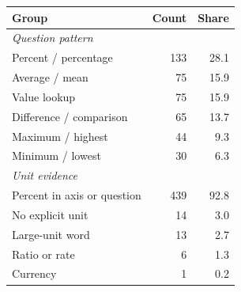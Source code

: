 \begin{tabular}{lrr}
\toprule
Group & Count & Share \\
\midrule
\multicolumn{3}{l}{\textit{Question pattern}} \\
Percent / percentage & 133 & 28.1 \\
Average / mean & 75 & 15.9 \\
Value lookup & 75 & 15.9 \\
Difference / comparison & 65 & 13.7 \\
Maximum / highest & 44 & 9.3 \\
Minimum / lowest & 30 & 6.3 \\
\midrule
\multicolumn{3}{l}{\textit{Unit evidence}} \\
Percent in axis or question & 439 & 92.8 \\
No explicit unit & 14 & 3.0 \\
Large-unit word & 13 & 2.7 \\
Ratio or rate & 6 & 1.3 \\
Currency & 1 & 0.2 \\
\bottomrule
\end{tabular}
